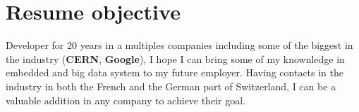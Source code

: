 \documentclass[a4paper]{deedy-resume} %
\begin{document}
\lastupdated




\section{Resume objective}

\begin{flushleft}
Developer for 20 years in a multiples companies including some of the biggest
in the industry (\textbf{CERN}, \textbf{Google}), I hope I can bring some of my
knownledge in embedded and big data system to my future employer. Having
contacts in the industry in both the French and the German part of Switzerland,
I can be a valuable addition in any company to achieve their goal.
\end{flushleft}


\noindent\makebox[\linewidth]{\color{headings}\rule{\paperwidth}{0.4pt}}

\end{document}
